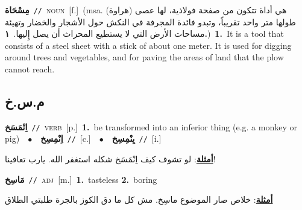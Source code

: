 \documentclass[10pt,a4paper,twoside]{article} %
\begin{document}
\begin{multicols}{2}
{\setlength\topsep{0pt}\textbf{\foreignlanguage{arabic}{مِسْحَاة}}\ {\color{gray}\texttt{//}\color{black}}\ \textsc{noun}\ [f.]\ \color{gray}(msa. \foreignlanguage{arabic}{هي أداة تتكون من صفحة فولاذية، لها عصى (هراوة) طولها متر واحد تقريباً، وتبدو فائدة المجرفة في النكش حول الأشجار والخضار وتهيئة مساحات الأرض التي لا يستطيع المحراث أن يصل إِليها.}~\foreignlanguage{arabic}{\textbf{١.}})\color{black}\ \textbf{1.}~It is a tool that consists of a steel sheet with a stick of about one meter. It is used for digging around trees and vegetables, and for paving the areas of land that the plow cannot reach.\ } \vspace{2mm}

\vspace{-3mm}
\subsection*{\color{blue}\foreignlanguage{arabic}{م.س.خ}\color{blue}{}} 

{\setlength\topsep{0pt}\textbf{\foreignlanguage{arabic}{اِنْمَسَخ}}\ {\color{gray}\texttt{//}\color{black}}\ \textsc{verb}\ [p.]\ \textbf{1.}~be transformed into an inferior thing (e.g. a monkey or pig)\ \ $\bullet$\ \ \setlength\topsep{0pt}\textbf{\foreignlanguage{arabic}{اِنْمِسِخ}}\ {\color{gray}\texttt{//}\color{black}}\ [c.]\ \ $\bullet$\ \ \setlength\topsep{0pt}\textbf{\foreignlanguage{arabic}{يِنْمِسِخ}}\ {\color{gray}\texttt{//}\color{black}}\ [i.]\  \begin{flushright}\color{gray}\foreignlanguage{arabic}{\textbf{\underline{\foreignlanguage{arabic}{أمثلة}}}: لو تشوف كيف اِنْمَسَخ شكله استغفر الله. يارب تعافينا!}\end{flushright}\color{black}} \vspace{2mm}

{\setlength\topsep{0pt}\textbf{\foreignlanguage{arabic}{مَاسِخ}}\ {\color{gray}\texttt{//}\color{black}}\ \textsc{adj}\ [m.]\ \textbf{1.}~tasteless  \textbf{2.}~boring\  \begin{flushright}\color{gray}\foreignlanguage{arabic}{\textbf{\underline{\foreignlanguage{arabic}{أمثلة}}}: خلاص صار الموضوع ماسِخ. مش كل ما دق الكوز بالجرة طلبتي الطلاق}\end{flushright}\color{black}} \vspace{2mm}


\end{multicols}
\end{document}
